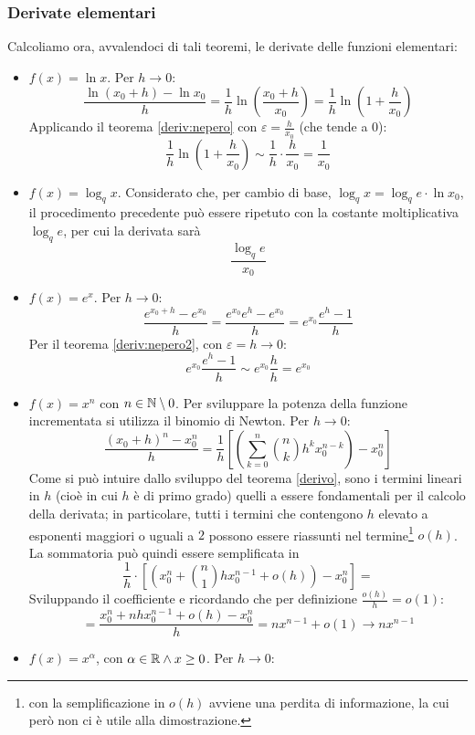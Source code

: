 \subsubsection{Derivate elementari}
Calcoliamo ora, avvalendoci di tali teoremi, le derivate delle funzioni elementari:
\begin{itemize}
	\item $f(x)=\ln x$. Per $h\to0$:
	      \[
		      \frac{\ln (x_0+h)-\ln x_0}{h}=\frac{1}{h}\ln\left(\frac{x_0+h}{x_0}\right)=\frac{1}{h}\ln\left(1+\frac{h}{x_0}\right)
	      \]
	      Applicando il teorema \ref{deriv:nepero} con $\varepsilon=\frac{h}{x_0}$ (che tende a $0$):
	      \[
		      \frac{1}{h}\ln\left(1+\frac{h}{x_0}\right)\sim\frac{1}{h}\cdot \frac{h}{x_0}=\frac{1}{x_0}
	      \]
	\item $f(x)=\log_q x$. Considerato che, per cambio di base, $\log_q x=\log_q e\cdot \ln x_0$, il procedimento precedente può essere ripetuto con la costante moltiplicativa $\log_q e$, per cui la derivata sarà
	      \[
		      \frac{\log_q e}{x_0}
	      \]
	\item $f(x)=e^x$. Per $h\to0$:
	      \[
		      \frac{e^{x_0+h}-e^{x_0}}{h}=\frac{e^{x_0}e^h-e^{x_0}}{h}=e^{x_0}\frac{e^h-1}{h}
	      \]
	      Per il teorema \ref{deriv:nepero2}, con $\varepsilon=h\to0$:
	      \[
		      e^{x_0}\frac{e^h-1}{h}\sim e^{x_0}\frac{h}{h}=e^{x_0}
	      \]
	\item $f(x)=x^n$ con $n\in\mathbb{N}\setminus 0$. Per sviluppare la potenza della funzione incrementata si utilizza il binomio di Newton. Per $h\to0$:
	      \[
		      \frac{(x_0+h)^n-x_0^n}{h}=\frac{1}{h}\left[\left(\sum_{k=0}^n \binom{n}{k}h^k x_0^{n-k}\right)-x_0^n\right]
	      \]
	      Come si può intuire dallo sviluppo del teorema \ref{derivo}, sono i termini lineari in $h$ (cioè in cui $h$ è di primo grado) quelli a essere fondamentali per il calcolo della derivata; in particolare, tutti i termini che contengono $h$ elevato a esponenti maggiori o uguali a $2$ possono essere riassunti nel termine\footnote{con la semplificazione in $o(h)$ avviene una perdita di informazione, la cui però non ci è utile alla dimostrazione.} $o(h)$. La sommatoria può quindi essere semplificata in
	      \[
		      \frac{1}{h}\cdot \left[\left(x_0^n+\binom{n}{1}h x_0^{n-1}+o(h)\right)-x_0^n\right]=
	      \]
	      Sviluppando il coefficiente e ricordando che per definizione $\frac{o(h)}{h}=o(1)$:
	      \[
		      =\frac{x_0^n+nhx_0^{n-1}+o(h)-x_0^n}{h}=nx^{n-1}+o(1)\to nx^{n-1}
	      \]
	\item $f(x)=x^\alpha$, con $\alpha\in\mathbb{R}\land x\geq0$. Per $h\to0$:

\end{itemize}

